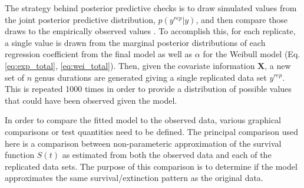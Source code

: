 \documentclass[12pt,letterpaper]{article}
\begin{document}
The strategy behind posterior predictive checks is to draw simulated values from the joint posterior predictive distribution, \(p(y^{rep} | y)\), and then compare those draws to the empirically observed values \citep{Gelman2013d}. To accomplish this, for each replicate, a single value is drawn from the marginal posterior distributions of each regression coefficient from the final model as well as \(\alpha\) for the Weibull model (Eq. \ref{eq:exp_total}, \ref{eq:wei_total}). Then, given the covariate information \(\mathbf{X}\), a new set of \(n\) genus durations are generated giving a single replicated data set \(y^{rep}\). This is repeated 1000 times in order to provide a distribution of possible values that could have been observed given the model. 

In order to compare the fitted model to the observed data, various graphical comparisons or test quantities need to be defined. The principal comparison used here is a comparison between non-parameteric approximation of the survival function \(S(t)\) as estimated from both the observed data and each of the replicated data sets. The purpose of this comparison is to determine if the model approximates the same survival/extinction pattern as the original data. 

%
%
\end{document}
